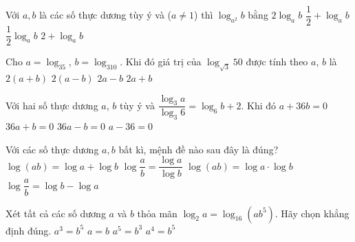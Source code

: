 \begin{ex}%
	Với $ a,b$ là các số thực  dương tùy ý và ($ a\ne 1$) thì $\log_{a^2}b$ bằng
	\choice 
		{$ 2\log_ab$} 
		 {$\dfrac{1}{2}+\log_ab$}
		{\True $\dfrac{1}{2}{\log_a}b$} 
		{$ 2+\log_ab$} 
\end{ex}

\begin{ex}%
	Cho $a=\log_35$, $b=\log_310$. Khi đó giá  trị của $\log_{\sqrt{3}}50$ được tính theo $a$, $b$ là
	 \choice
		{\True $2(a+b)$} 
		{$2(a-b)$} 
		 {$2a-b$}
		 {$2a+b$}
\end{ex}

\begin{ex}%
	Với hai số thực dương $a$, $b$ tùy ý  và $\dfrac{\log_3 a}{\log_3 6}=\log_6 b +2$. Khi đó
	 \choice
		 {$a+36b=0$}
		 {$36a+b=0$}
		 {$36a-b=0$}
		{\True  $a-36=0$}
\end{ex}

\begin{ex}%
	Với các số thực dương  $a, b$ bất kì, mệnh đề nào sau đây là đúng?
	\choice 
		{\True $\log (a b)=\log  a+\log b$}
		{$\log  \dfrac{a}{b}=\dfrac{\log a}{\log b}$}
		{$\log  (a b)=\log a \cdot \log b$}
		{$\log  \dfrac{a}{b}=\log b-\log a$}
\end{ex}

\begin{ex}%
	Xét tất cả các số dương $a$ và $b$ thỏa mãn $\log_2 a=\log_{16}\left(ab^5\right)$. Hãy chọn khẳng  định đúng.
	\choice 
		{\True $a^3=b^5$} 
		{$a=b$} 
		{$a^5=b^3$} 
		 {$a^4=b^5$}
\end{ex}

